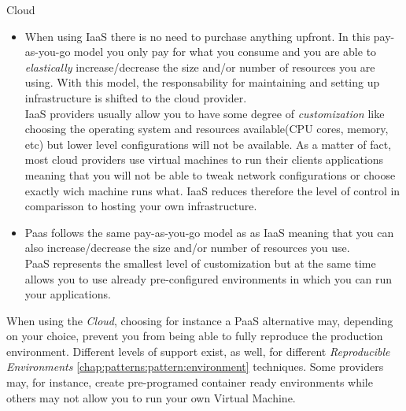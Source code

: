 \begin{pattern}{Cloud}
\begin{itemize}
            \item When using IaaS there is no need to purchase anything upfront. In this pay-as-you-go model you only pay for what you consume and you are able to \textit{elastically} increase/decrease the size and/or number of resources you are using. With this model, the responsability for maintaining and setting up infrastructure is shifted to the cloud provider. \\
            IaaS providers usually allow you to have some degree of \textit{customization} like choosing the operating system and resources available(CPU cores, memory, etc) but lower level configurations will not be available. As a matter of fact, most cloud providers use virtual machines to run their clients applications meaning that you will not be able to tweak network configurations or choose exactly wich machine runs what. IaaS reduces therefore the level of control in comparisson to hosting your own infrastructure.

            \item Paas follows the same pay-as-you-go model as as IaaS meaning that you can also increase/decrease the size and/or number of resources you use. \\
            PaaS represents the smallest level of customization but at the same time allows you to use already pre-configured environments in which you can run your applications.
        \end{itemize}

    \related
    When using the \textit{Cloud}, choosing for instance a PaaS alternative may, depending on your choice, prevent you from being able to fully reproduce the production environment. Different levels of support exist, as well, for different \textit{Reproducible Environments} \ref{chap:patterns:pattern:environment} techniques. Some providers may, for instance, create pre-programed container ready environments while others may not allow you to run your own Virtual Machine.
\end{pattern}







